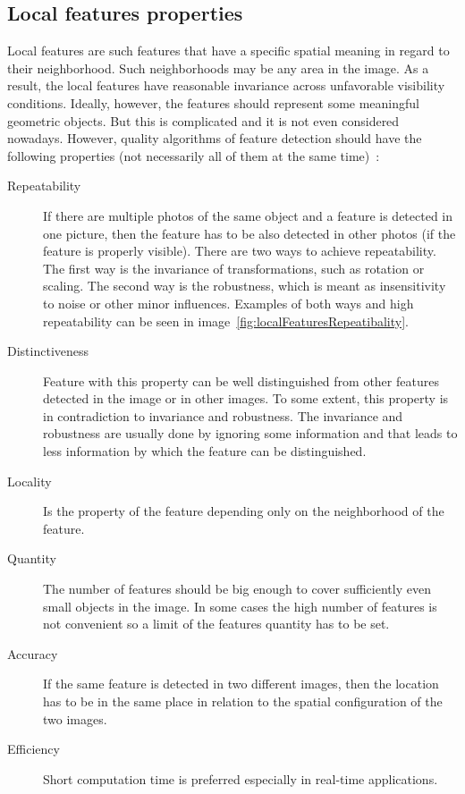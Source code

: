 \documentclass[thesis=B,english]{FITthesis}[2019/12/23]
\begin{document}
        \subsection{Local features properties}
        Local features are such features that have a specific spatial meaning in regard to their neighborhood.  Such neighborhoods may be any area in the image. As a result, the local features have reasonable invariance across unfavorable visibility conditions. Ideally, however, the features should represent some meaningful geometric objects. But this is complicated and it is not even considered nowadays. However, quality algorithms of feature detection should have the following properties (not necessarily all of them at the same time)~\cite{Mikolajczyk2015}:
        \begin{description}
            \item[Repeatability] If there are  multiple photos of the same object and a feature is detected in one picture, then the feature has to be also detected in other photos (if the feature is properly visible). There are two ways to achieve repeatability. The first way is the invariance of transformations, such as rotation or scaling. The second way is the robustness, which is meant as insensitivity to noise or other minor influences. Examples of both ways and high repeatability can be seen in image~\ref{fig:localFeaturesRepeatibality}.
            \item[Distinctiveness] Feature with this property can be well distinguished from other features detected in the image or in other images. To some extent, this property is in contradiction to invariance and robustness. The invariance and robustness are usually done by ignoring some information and that leads to less information by which the feature can be distinguished.
            \item[Locality] Is the property of the feature depending only on the neighborhood of the feature.
            \item[Quantity] The number of features should be big enough to cover sufficiently even small objects in the image. In some cases the high number of features is not convenient so a limit of the features quantity has to be set.
            \item[Accuracy] If the same feature is detected in two different images, then the location has to be in the same place in relation to the spatial configuration of the two images.
            \item[Efficiency] Short computation time is preferred especially in real-time applications.
        \end{description}
        
\end{document}
